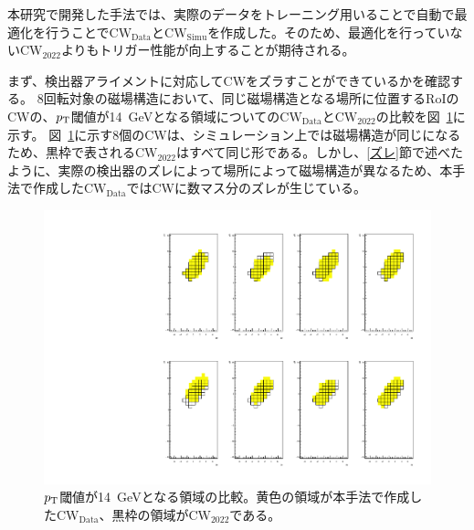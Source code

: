 本研究で開発した手法では、実際のデータをトレーニング用いることで自動で最適化を行うことで$\mathrm{CW_{Data}}$と$\mathrm{CW_{Simu}}$を作成した。そのため、最適化を行っていない$\mathrm{CW_{2022}}$よりもトリガー性能が向上することが期待される。

まず、検出器アライメントに対応してCWをズラすことができているかを確認する。
8回転対象の磁場構造において、同じ磁場構造となる場所に位置するRoIのCWの、$p_{\rm{T}}$閾値が14~GeVとなる領域についての$\mathrm{CW_{Data}}$と$\mathrm{CW_{2022}}$の比較を図~\ref{fig:CWv05v07}に示す。
図~\ref{fig:CWv05v07}に示す8個のCWは、シミュレーション上では磁場構造が同じになるため、黒枠で表される$\mathrm{CW_{2022}}$はすべて同じ形である。しかし、\ref{ズレ}節で述べたように、実際の検出器のズレによって場所によって磁場構造が異なるため、本手法で作成した$\mathrm{CW_{Data}}$ではCWに数マス分のズレが生じている。
\begin{figure}[tb]
  \centering
  \includegraphics[clip, width=13cm]{fig/5/ALL_Aside_Endcap_phiSector_Octant1_roi58.pdf}
  \caption{$p_{\rm{T}}$閾値が14~GeVとなる領域の比較。黄色の領域が本手法で作成した$\mathrm{CW_{Data}}$、黒枠の領域が$\mathrm{CW_{2022}}$である。}
  \label{fig:CWv05v07}
\end{figure}

